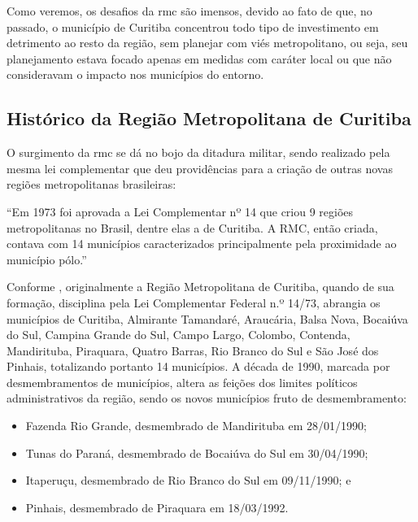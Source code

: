 	Como veremos, os desafios da \gls{rmc} são imensos, devido ao fato de que, no passado, o município de Curitiba concentrou todo tipo de investimento em detrimento ao resto da região, sem planejar com viés metropolitano, ou seja, seu planejamento estava focado apenas em medidas com caráter local ou que não consideravam o impacto nos municípios do entorno.

	\subsection{Histórico da Região Metropolitana de Curitiba}
	
	O surgimento da \glsdesc{rmc} se dá no bojo da ditadura militar, sendo realizado pela mesma lei complementar que deu providências para a criação de outras novas regiões metropolitanas brasileiras:
	
	\begin{citacao}
		``Em  1973  foi  aprovada  a  Lei  Complementar  nº  14  que  criou  9  regiões metropolitanas no Brasil, dentre elas a de Curitiba. A RMC, então criada, contava com 14 municípios caracterizados principalmente pela proximidade ao município pólo.'' 
	\end{citacao}
	
	Conforme , originalmente a Região Metropolitana de Curitiba, quando de sua formação, disciplina pela Lei Complementar Federal n.º 14/73, abrangia os municípios de Curitiba, Almirante Tamandaré, Araucária, Balsa Nova, Bocaiúva do Sul, Campina Grande do Sul, Campo Largo, Colombo, Contenda, Mandirituba, Piraquara, Quatro Barras, Rio Branco do Sul e São José dos Pinhais, totalizando portanto 14 municípios. A década de 1990, marcada por desmembramentos de municípios, altera as feições dos limites políticos administrativos da região, sendo os novos municípios fruto de desmembramento:
	
	\begin{itemize}
		\item Fazenda Rio Grande, desmembrado de Mandirituba em 28/01/1990;
		\item Tunas do Paraná, desmembrado de Bocaiúva do Sul em 30/04/1990;
		\item Itaperuçu, desmembrado de Rio Branco do Sul em 09/11/1990; e
		\item Pinhais, desmembrado de Piraquara em 18/03/1992.
	\end{itemize}
	
